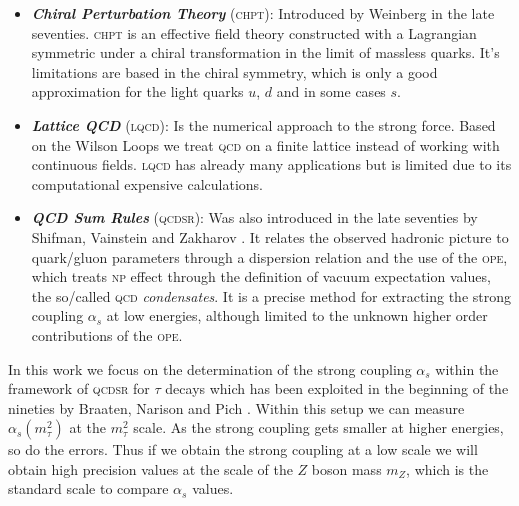 \documentclass[../../index.tex]{subfiles}
\begin{document}
\begin{itemize}
\item \textbf{\textit{Chiral Perturbation Theory}}
  (\textsc{chpt}):
  Introduced by Weinberg \cite{Weinberg1978} in the late seventies.
  \textsc{chpt} is an effective field theory constructed with a Lagrangian
  symmetric under a chiral transformation in the limit of massless quarks. It's
  limitations are based in the chiral symmetry, which is only a good
  approximation for the light quarks \(u\), \(d\) and in some cases \(s\).
\item \textbf{\textit{Lattice QCD}}
  (\textsc{lqcd}):
  Is the numerical approach to the strong force. Based on the Wilson Loops
  \cite{Wilson1974} we treat \textsc{qcd} on a finite lattice instead of working
  with continuous fields. \textsc{lqcd} has already many applications but is
  limited due to its computational expensive calculations.
\item \textbf{\textit{QCD Sum Rules}}
  (\textsc{qcdsr}): Was also introduced in the late seventies by Shifman, Vainstein and
  Zakharov \cite{Shifman1978,Shifman1978a}. It relates the observed hadronic
  picture to quark\-/gluon parameters through a dispersion relation and the use
  of the \textsc{ope}, which treats \textsc{np} effect through the definition of
  vacuum expectation values, the so\-/called \textsc{qcd} \textit{condensates}.
  It is a precise method for extracting the strong coupling \(\alpha_s\) at low
  energies, although limited to the unknown higher order contributions of the
  \textsc{ope}.
\end{itemize}


In this work we focus on the determination of the strong coupling \(\alpha_s\)
within the framework of \textsc{qcdsr} for \(\tau\) decays which has been
exploited in the beginning of the nineties by Braaten, Narison and Pich
\cite{Braaten1991}. Within this setup we can measure \(\alpha_s(m_\tau^2)\) at
the \(m_\tau^2\) scale. As the strong coupling gets smaller at higher energies,
so do the errors. Thus if we obtain the strong coupling at a low scale we will
obtain high precision values at the scale of the \(Z\) boson mass \(m_Z\), which
is the standard scale to compare \(\alpha_s\) values.
\end{document}
